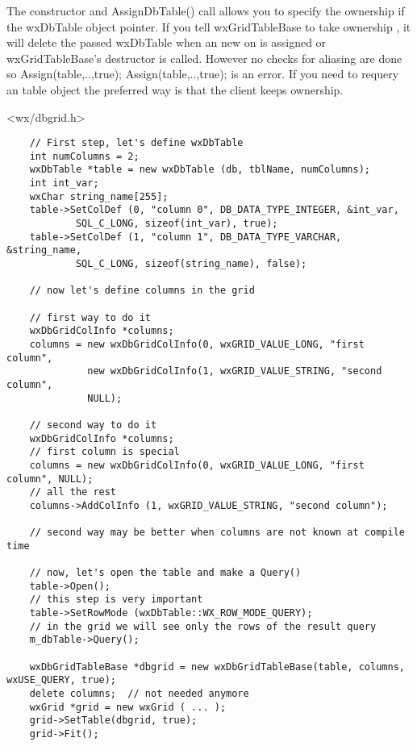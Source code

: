 The constructor and AssignDbTable() call allows you to specify the ownership if the wxDbTable
object pointer. If you tell wxGridTableBase to take ownership , it will delete the passed wxDbTable
when an new on is assigned or wxGridTableBase's destructor is called.
However no checks for aliasing are done so Assign(table,..,true); Assign(table,..,true); 
is  an error. If you need to requery an table object the preferred way is
that the client keeps ownership.




<wx/dbgrid.h>



\begin{verbatim}
	// First step, let's define wxDbTable
	int numColumns = 2;
	wxDbTable *table = new wxDbTable (db, tblName, numColumns);
	int int_var;
	wxChar string_name[255];
	table->SetColDef (0, "column 0", DB_DATA_TYPE_INTEGER, &int_var,
			SQL_C_LONG, sizeof(int_var), true);
	table->SetColDef (1, "column 1", DB_DATA_TYPE_VARCHAR, &string_name,
			SQL_C_LONG, sizeof(string_name), false);

    // now let's define columns in the grid

    // first way to do it
    wxDbGridColInfo *columns;
    columns = new wxDbGridColInfo(0, wxGRID_VALUE_LONG, "first column",
              new wxDbGridColInfo(1, wxGRID_VALUE_STRING, "second column",
              NULL);

    // second way to do it
    wxDbGridColInfo *columns;
    // first column is special
    columns = new wxDbGridColInfo(0, wxGRID_VALUE_LONG, "first column", NULL);
    // all the rest
    columns->AddColInfo (1, wxGRID_VALUE_STRING, "second column");

    // second way may be better when columns are not known at compile time

    // now, let's open the table and make a Query()
    table->Open();
    // this step is very important
    table->SetRowMode (wxDbTable::WX_ROW_MODE_QUERY);
    // in the grid we will see only the rows of the result query
    m_dbTable->Query();

    wxDbGridTableBase *dbgrid = new wxDbGridTableBase(table, columns, wxUSE_QUERY, true);
    delete columns;  // not needed anymore
    wxGrid *grid = new wxGrid ( ... );
    grid->SetTable(dbgrid, true);
    grid->Fit();
\end{verbatim}


